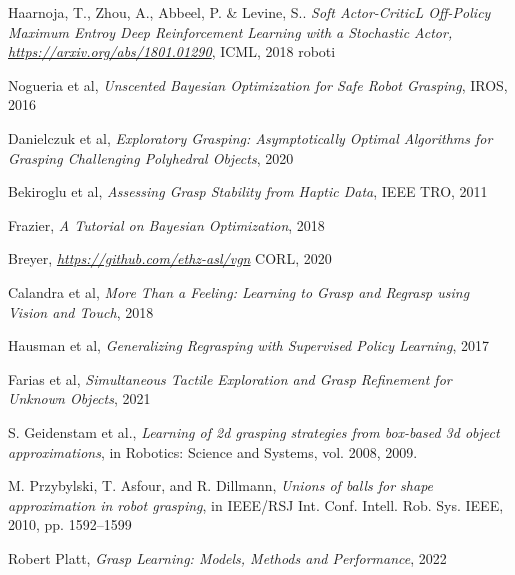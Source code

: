 \documentclass[12pt, a4paper]{report}
\theoremstyle{definition}
\begin{document}
\appendix


\begin{thebibliography}{9}
    Haarnoja, T., Zhou, A., Abbeel, P. & Levine, S..
    \textit{Soft Actor-CriticL Off-Policy Maximum Entroy Deep Reinforcement Learning with a Stochastic Actor, \href{https://arxiv.org/abs/1801.01290}{https://arxiv.org/abs/1801.01290}},
    ICML,
    2018 roboti

    Nogueria et al,
    \textit{Unscented Bayesian Optimization for Safe Robot Grasping},
    IROS,
    2016

    Danielczuk et al,
    \textit{Exploratory Grasping: Asymptotically Optimal Algorithms for Grasping Challenging Polyhedral Objects},
    2020

    Bekiroglu et al,
    \textit{Assessing Grasp Stability from Haptic Data},
    IEEE TRO,
    2011

    Frazier,
    \textit{A Tutorial on Bayesian Optimization},
    2018

    Breyer,
    \textit{\href{https://github.com/ethz-asl/vgn}{https://github.com/ethz-asl/vgn}}
    CORL,
    2020

    Calandra et al,
    \textit{More Than a Feeling: Learning to Grasp and Regrasp using Vision and Touch},
    2018

    Hausman et al,
    \textit{Generalizing Regrasping with Supervised Policy Learning},
    2017

    Farias et al,
    \textit{Simultaneous Tactile Exploration and Grasp Refinement for Unknown Objects},
    2021

    S. Geidenstam et al.,
    \textit{Learning of 2d grasping strategies from box-based 3d object approximations}, in Robotics: Science and Systems, vol.
    2008, 2009.

    M. Przybylski, T. Asfour, and R. Dillmann,
    \textit{Unions of balls for shape approximation in robot grasping}, in IEEE/RSJ Int. Conf. Intell. Rob. Sys. IEEE, 2010, pp. 1592–1599

    Robert Platt,
    \textit{Grasp Learning: Models, Methods and Performance},
    2022


\end{thebibliography}
\end{document}
